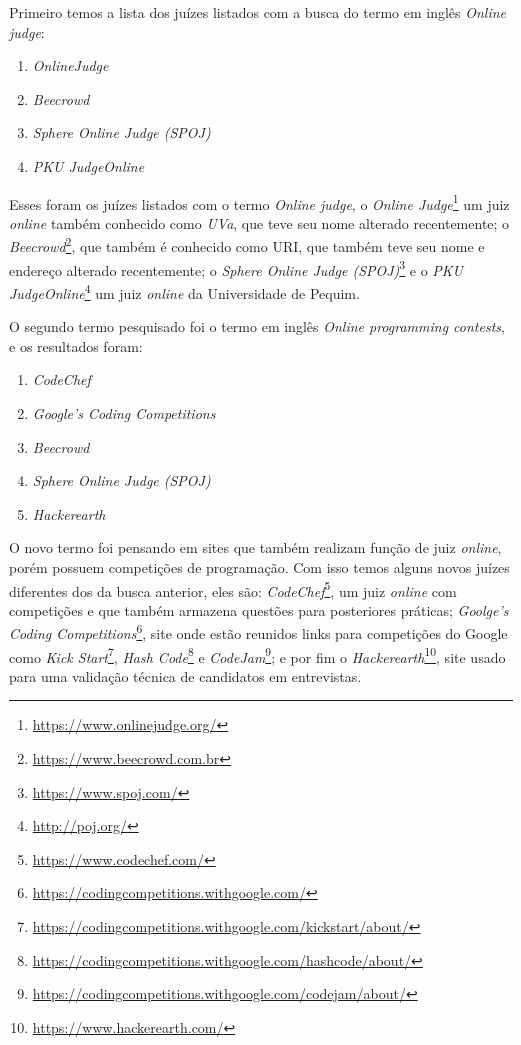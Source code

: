 Primeiro temos a lista dos juízes listados com a busca do termo em inglês \textit{Online judge}:

\begin{enumerate}
    \item \textit{OnlineJudge}
    \item \textit{Beecrowd}
    \item \textit{Sphere Online Judge (SPOJ)}
    \item \textit{PKU JudgeOnline}
\end{enumerate}

Esses foram os juízes listados com o termo \textit{Online judge}, o \textit{Online Judge}\footnote{\url{https://www.onlinejudge.org/}} um juiz \textit{online} também conhecido como \textit{UVa}, que teve seu nome alterado recentemente;
o \textit{Beecrowd}\footnote{\url{https://www.beecrowd.com.br}}, que também é conhecido como URI, que também teve seu nome e endereço alterado recentemente; 
o \textit{Sphere Online Judge (SPOJ)}\footnote{\url{https://www.spoj.com/}} e o \textit{PKU JudgeOnline}\footnote{\url{http://poj.org/}} um juiz \textit{online} da Universidade de Pequim.

O segundo termo pesquisado foi o termo em inglês \textit{Online programming contests}, e os resultados foram:

\begin{enumerate}
    \item \textit{CodeChef}
    \item \textit{Google's Coding Competitions}
    \item \textit{Beecrowd}
    \item \textit{Sphere Online Judge (SPOJ)}
    \item \textit{Hackerearth}
\end{enumerate}

O novo termo foi pensando em sites que também realizam função de juiz \textit{online}, porém possuem competições de programação. Com isso temos alguns novos juízes diferentes dos da busca anterior, eles são: \textit{CodeChef}\footnote{\url{https://www.codechef.com/}}, um juiz \textit{online} com competições e que também armazena questões para posteriores práticas; \textit{Goolge's Coding Competitions}\footnote{\url{https://codingcompetitions.withgoogle.com/}}, site onde estão reunidos links para competições do Google como \textit{Kick Start}\footnote{\url{https://codingcompetitions.withgoogle.com/kickstart/about/}}, \textit{Hash Code}\footnote{\url{https://codingcompetitions.withgoogle.com/hashcode/about/}} e \textit{CodeJam}\footnote{\url{https://codingcompetitions.withgoogle.com/codejam/about/}}; e por fim o \textit{Hackerearth}\footnote{\url{https://www.hackerearth.com/}}, site usado para uma validação técnica de candidatos em entrevistas.

